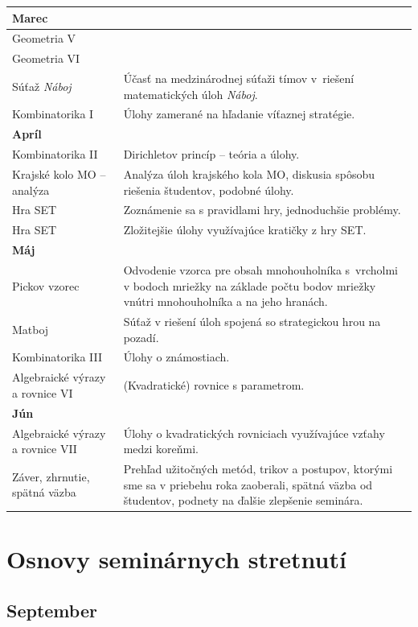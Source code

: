 \documentclass[11pt,a4paper,oneside,final]{book}
\begin{document}
\begin{tabularx}{\textwidth}{X X}
\textbf{Marec} & \\
\hline
Geometria V& \\
\hline
Geometria VI & \\
\hline
Súťaž \textit{Náboj} & Účasť na medzinárodnej súťaži tímov v~riešení matematických úloh \textit{Náboj}. \\
\hline
Kombinatorika I & Úlohy zamerané na hľadanie víťaznej stratégie.\\
\hline
\textbf{Apríl} & \\
\hline
Kombinatorika II & Dirichletov princíp -- teória a úlohy.\\
\hline
Krajské kolo MO -- analýza & Analýza úloh krajského kola MO, diskusia spôsobu riešenia študentov, podobné úlohy.\\
\hline
Hra SET& Zoznámenie sa s pravidlami hry, jednoduchšie problémy.\\
\hline
Hra SET & Zložitejšie úlohy využívajúce kratičky z hry SET.\\
\hline
\textbf{Máj} & \\
\hline
Pickov vzorec & Odvodenie vzorca pre obsah mnohouholníka s~vrcholmi v bodoch mriežky na základe počtu bodov mriežky vnútri mnohouholníka a na jeho hranách.\\
\hline
Matboj & Súťaž v riešení úloh spojená so strategickou hrou na pozadí.\\
\hline
Kombinatorika III & Úlohy o známostiach. \\
\hline
Algebraické výrazy a rovnice VI & (Kvadratické) rovnice s parametrom.\\
\hline
\textbf{Jún} & \\
\hline
Algebraické výrazy a rovnice VII & Úlohy o kvadratických rovniciach využívajúce vzťahy medzi koreňmi.\\
\hline
Záver, zhrnutie, spätná väzba & Prehľad užitočných metód, trikov a postupov, ktorými sme sa v priebehu roka zaoberali, spätná väzba od študentov, podnety na ďal\-šie zlepšenie seminára.\\
\hline
\end{tabularx}




\chapter{Osnovy seminárnych stretnutí}


\section{September}
\end{document}
